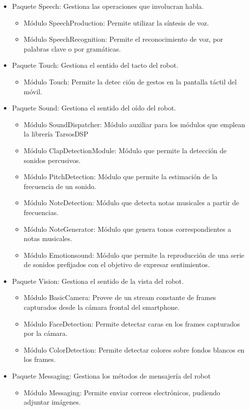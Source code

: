 \begin{itemize}
	\item Paquete Speech: Gestiona las operaciones que involucran habla.
		\begin{itemize}
		\item Módulo SpeechProduction: Permite utilizar la síntesis de voz.
		\item Módulo SpeechRecognition: Permite el reconocimiento de voz, por palabras clave o por gramáticas.
		\end{itemize}
	\item Paquete Touch: Gestiona el sentido del tacto del robot.
		\begin{itemize}
		\item Módulo Touch: Permite la detec	ción de gestos en la pantalla táctil del móvil.
		\end{itemize}
	\item Paquete Sound: Gestiona el sentido del oído del robot.
		\begin{itemize}
		\item Módulo SoundDispatcher: Módulo auxiliar para los módulos que emplean la librería TarsosDSP\cite{six2014tarsosdsp}
		\item Módulo ClapDetectionModule: Módulo que permite la detección de sonidos percusivos.
		\item Módulo PitchDetection: Módulo que permite la estimación de la frecuencia de un sonido.
		\item Módulo NoteDetection: Módulo que detecta notas musicales a partir de frecuencias.
		\item Módulo NoteGenerator: Módulo que genera tonos correspondientes a notas musicales.
		\item Módulo Emotionsound: Módulo que permite la reproducción de una serie de sonidos prefijados con el objetivo de expresar sentimientos.
		\end{itemize}
	\item Paquete Vision: Gestiona el sentido de la vista del robot.
	\begin{itemize}
	\item Módulo BasicCamera: Provee de un stream constante de frames capturados desde la cámara frontal del smartphone.
	\item Módulo FaceDetection: Permite detectar caras en los frames capturados por la cámara.
	\item Módulo ColorDetection: Permite detectar colores sobre fondos blancos en los frames.
	
	\end{itemize}
	\item Paquete Messaging: Gestiona los métodos de mensajería del robot
		\begin{itemize}
		\item Módulo Messaging: Permite enviar correos electrónicos, pudiendo adjuntar imágenes.
		\end{itemize}
\end{itemize}


